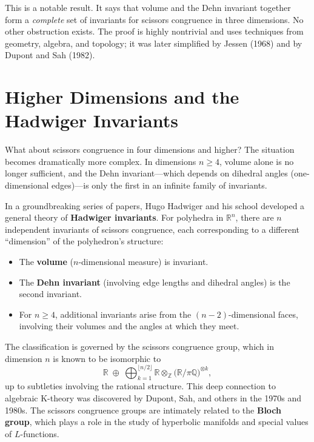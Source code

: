 This is a notable result. It says that volume and the Dehn invariant together form a \emph{complete} set of invariants for scissors congruence in three dimensions. No other obstruction exists. The proof is highly nontrivial and uses techniques from geometry, algebra, and topology; it was later simplified by Jessen (1968) and by Dupont and Sah (1982).

\section{Higher Dimensions and the Hadwiger Invariants}

What about scissors congruence in four dimensions and higher? The situation becomes dramatically more complex. In dimensions $n \geq 4$, volume alone is no longer sufficient, and the Dehn invariant---which depends on dihedral angles (one-dimensional edges)---is only the first in an infinite family of invariants.

In a groundbreaking series of papers, Hugo Hadwiger and his school developed a general theory of \textbf{Hadwiger invariants}. For polyhedra in $\mathbb{R}^n$, there are $n$ independent invariants of scissors congruence, each corresponding to a different ``dimension'' of the polyhedron's structure:

\begin{itemize}
    \item The \textbf{volume} ($n$-dimensional measure) is invariant.
    \item The \textbf{Dehn invariant} (involving edge lengths and dihedral angles) is the second invariant.
    \item For $n \geq 4$, additional invariants arise from the $(n-2)$-dimensional faces, involving their volumes and the angles at which they meet.
\end{itemize}

The classification is governed by the scissors congruence group, which in dimension $n$ is known to be isomorphic to
\[
\mathbb{R} \;\oplus\; \bigoplus_{k=1}^{\lfloor n/2 \rfloor} \mathbb{R} \otimes_{\mathbb{Z}} \bigl( \mathbb{R} / \pi\mathbb{Q} \bigr)^{\otimes k},
\]
up to subtleties involving the rational structure. This deep connection to algebraic K-theory was discovered by Dupont, Sah, and others in the 1970s and 1980s. The scissors congruence groups are intimately related to the \textbf{Bloch group}, which plays a role in the study of hyperbolic manifolds and special values of $L$-functions.

